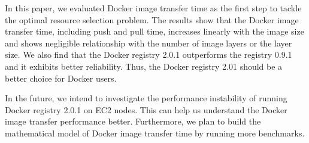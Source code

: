 \documentclass{ieicej}
\begin{document}
In this paper, we evaluated Docker image transfer time as the first step to tackle the optimal resource selection problem. The results show that the Docker image transfer time, including push and pull time, increases linearly with the image size and shows negligible relationship with the number of image layers or the layer size. We also find that the Docker registry 2.0.1 outperforms the registry 0.9.1 and it exhibits better reliability. Thus, the Docker registry 2.01 should be a better choice for Docker users.


In the future, we intend to investigate the performance instability of running Docker registry 2.0.1 on EC2 nodes. This can help us understand the Docker image transfer performance better. Furthermore, we plan to build the mathematical model of Docker image transfer time by running more benchmarks.






\end{document}
